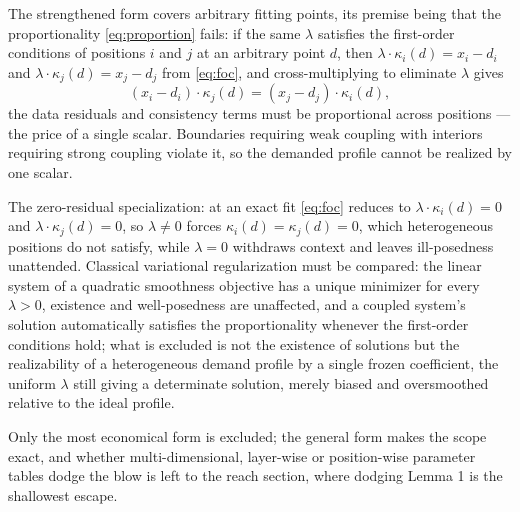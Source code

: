 \argument The strengthened form covers arbitrary fitting points, its premise being that the proportionality \eqref{eq:proportion} fails: if the same $\lambda$ satisfies the first-order conditions of positions $i$ and $j$ at an arbitrary point $d$, then $\lambda \cdot \kappa_i (d) = x_i - d_i$ and $\lambda \cdot \kappa_j (d) = x_j - d_j$ from \eqref{eq:foc}, and cross-multiplying to eliminate $\lambda$ gives
\begin{equation}
(x_i - d_i) \cdot \kappa_j (d) = (x_j - d_j) \cdot \kappa_i (d),
\label{eq:proportion}
\end{equation}
the data residuals and consistency terms must be proportional across positions --- the price of a single scalar. Boundaries requiring weak coupling with interiors requiring strong coupling violate it, so the demanded profile cannot be realized by one scalar.

The zero-residual specialization: at an exact fit \eqref{eq:foc} reduces to $\lambda \cdot \kappa_i (d) = 0$ and $\lambda \cdot \kappa_j (d) = 0$, so $\lambda \neq 0$ forces $\kappa_i (d) = \kappa_j (d) = 0$, which heterogeneous positions do not satisfy, while $\lambda = 0$ withdraws context and leaves ill-posedness unattended. Classical variational regularization must be compared: the linear system of a quadratic smoothness objective has a unique minimizer for every $\lambda > 0$, existence and well-posedness are unaffected, and a coupled system's solution automatically satisfies the proportionality whenever the first-order conditions hold; what is excluded is not the existence of solutions but the realizability of a heterogeneous demand profile by a single frozen coefficient, the uniform $\lambda$ still giving a determinate solution, merely biased and oversmoothed relative to the ideal profile.\qedbox

Only the most economical form is excluded; the general form makes the scope exact, and whether multi-dimensional, layer-wise or position-wise parameter tables dodge the blow is left to the reach section, where dodging Lemma 1 is the shallowest escape.


